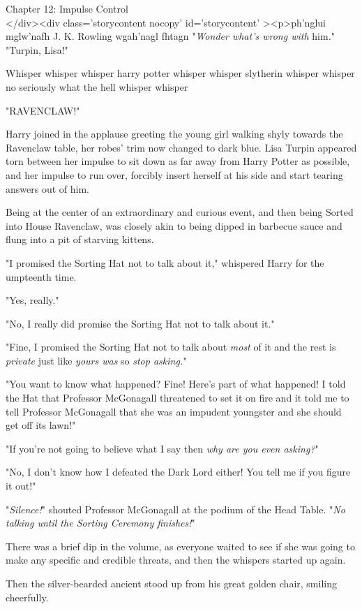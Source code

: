 
Chapter 12: Impulse Control\\
</div><div  class='storycontent nocopy' id='storycontent' ><p>ph'nglui 
mglw'nafh J. K. Rowling wgah'nagl fhtagn
\sbreak
"\emph{Wonder what's wrong with} him\emph{.}"
\sbreak
"Turpin, Lisa!"

Whisper whisper whisper harry potter whisper whisper slytherin whisper whisper 
no seriously what the hell whisper whisper

"RAVENCLAW!"

Harry joined in the applause greeting the young girl walking shyly towards the 
Ravenclaw table, her robes' trim now changed to dark blue. Lisa Turpin appeared 
torn between her impulse to sit down as far away from Harry Potter as possible, 
and her impulse to run over, forcibly insert herself at his side and start 
tearing answers out of him.

Being at the center of an extraordinary and curious event, and then being 
Sorted into House Ravenclaw, was closely akin to being dipped in barbecue sauce 
and flung into a pit of starving kittens.

"I promised the Sorting Hat not to talk about it," whispered Harry for the 
umpteenth time.

"Yes, really."

"No, I really did promise the Sorting Hat not to talk about it."

"Fine, I promised the Sorting Hat not to talk about \emph{most} of it and the 
rest is \emph{private} just like \emph{yours was} so \emph{stop asking.}"

"You want to know what happened? Fine! Here's part of what happened! I told the 
Hat that Professor McGonagall threatened to set it on fire and it told me to 
tell Professor McGonagall that she was an impudent youngster and she should get 
off its lawn!"

"If you're not going to believe what I say then \emph{why are you even asking?}"

"No, I don't know how I defeated the Dark Lord either! You tell me if you 
figure it out!"

"\emph{Silence!}" shouted Professor McGonagall at the podium of the Head Table. 
"\emph{No talking until the Sorting Ceremony finishes!}"

There was a brief dip in the volume, as everyone waited to see if she was going 
to make any specific and credible threats, and then the whispers started up 
again.

Then the silver-bearded ancient stood up from his great golden chair, smiling 
cheerfully.

